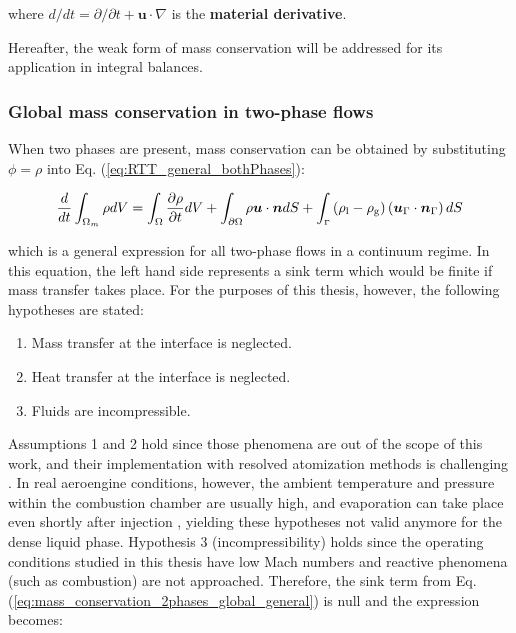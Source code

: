 where $d / d t = \partial / \partial t + \boldsymbol{u} \cdot \nabla $ is the \textbf{material derivative}. 

Hereafter, the weak form of mass conservation will be addressed for its application in integral balances.

\subsubsection*{Global mass conservation in two-phase flows}

When two phases are present, mass conservation can be obtained by substituting $\phi = \rho$ into Eq. (\ref{eq:RTT_general_bothPhases}):

\begin{equation}
\label{eq:mass_conservation_2phases_global_general}
\frac{d}{dt} \int_{\Omega_m} \rho dV =   \int_{\Omega}  \frac{\partial \rho}{\partial t}  dV + \int_{\partial \Omega} \rho \boldsymbol{u} \cdot \boldsymbol{n} dS + \int_\mathsmaller{\Gamma} \left( \rho_\mathrm{l} - \rho_\mathrm{g} \right) \left( \boldsymbol{u}_{\scriptsize{\Gamma}} \cdot \boldsymbol{n}_{\scriptsize{\Gamma}} \right) dS
\end{equation}

which is a general expression for all two-phase flows in a continuum regime. In this equation, the left hand side represents a sink term which would be finite if mass transfer takes place. For the purposes of this thesis, however, the following hypotheses are stated:

\begin{enumerate}
\itemsep0em 
	\item Mass transfer at the interface is neglected.
	
	\item Heat transfer at the interface is neglected.
	
	\item Fluids are incompressible.

\end{enumerate}

Assumptions 1 and 2 hold since those phenomena are out of the scope of this work, and their implementation with resolved atomization methods is challenging . In real aeroengine conditions, however, the ambient temperature and pressure within the combustion chamber are usually high, and evaporation can take place even shortly after injection , yielding these hypotheses not valid anymore for the dense liquid phase. Hypothesis 3 (incompressibility) holds since the operating conditions studied in this thesis have low Mach numbers and reactive phenomena (such as combustion) are not approached. Therefore, the sink term from Eq. (\ref{eq:mass_conservation_2phases_global_general}) is null and the expression becomes:

